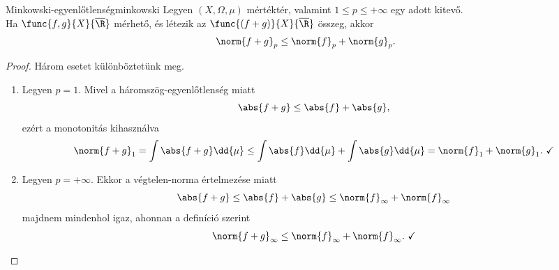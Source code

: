 \documentclass[
]{elteikthesis}[2024/04/26]
\begin{document}
	\newpage
	
	\begin{theorem}{Minkowski-egyenlőtlenség}{minkowski}
		Legyen \( (X, \Omega, \mu) \) mértéktér, 
		valamint \( 1 \leq p \leq +\infty \) egy adott kitevő.\\[6pt]
		Ha \( \func{f, g}{X}{\overline{\R}} \) mérhető, 
		és létezik az \( \func{(f + g)}{X}{\overline{\R}} \) összeg, akkor
		\[
			\norm{f + g}_p \leq \norm{f}_p + \norm{g}_p.
		\]
	\end{theorem}
	\begin{proof}
		Három esetet különböztetünk meg.
		\begin{enumerate}
			\item Legyen \( p = 1 \). Mivel a háromszög-egyenlőtlenség miatt
			\[
				\abs{f + g} \leq
				\abs{f} + \abs{g},
			\]
			ezért a monotonitás kihasználva
			\[
				\norm{f + g}_1 =
				\int \abs{f + g} \dd{\mu} \leq
				\int \abs{f} \dd{\mu} + \int \abs{g} \dd{\mu} =
				\norm{f}_1 + \norm{g}_1. \ \checkmark
			\]
			
			\item Legyen \( p = +\infty \). Ekkor a végtelen-norma értelmezése miatt
			\[
				\abs{f + g} \leq
				\abs{f} + \abs{g} \leq
				\norm{f}_\infty + \norm{f}_\infty
			\]
			majdnem mindenhol igaz, ahonnan a definíció szerint
			\[
				\norm{f + g}_\infty \leq
				\norm{f}_\infty + \norm{f}_\infty. \ \checkmark
			\]
			

\end{enumerate}
\end{proof}
\end{document}
